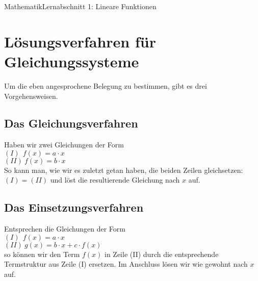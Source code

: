 \documentclass[11pt,twocolumn,oneside,openany,headings=optiontotoc,11pt,numbers=noenddot]{article}
\begin{document}
\begin{worksheet}{}{Mathematik}{Lernabschnitt 1: Lineare Funktionen}
		\section*{Lösungsverfahren für Gleichungssysteme}
		Um die eben angesprochene Belegung zu bestimmen, gibt es drei Vorgehensweisen.
		\subsection{Das Gleichungsverfahren}
		Haben wir zwei Gleichungen der Form\\
		\((I)\ \ f(x) = a\cdot{}x\)\\
		\((II)\ f(x) = b\cdot{}x\)\\
		So kann man, wie wir es zuletzt getan haben, die beiden Zeilen gleichsetzen: \((I) = (II)\) und löst die resultierende Gleichung nach \(x\) auf.
		\subsection{Das Einsetzungsverfahren}
		Entsprechen die Gleichungen der Form\\
		\((I)\ \ f(x) = a\cdot{}x\)\\
		\((II)\ g(x) = b\cdot{}x + c\cdot{}f(x)\)\\
		so können wir den Term \(f(x)\) in Zeile (II) durch die entsprechende Termstruktur aus Zeile (I) ersetzen. Im Anschluss lösen wir wie gewohnt nach \(x\) auf.

\end{worksheet}
\end{document}
